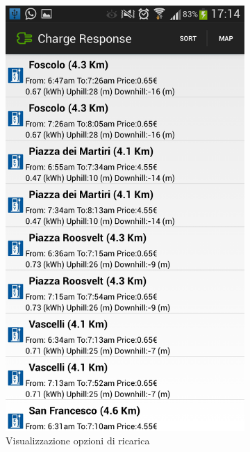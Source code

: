 \begin{figure}
\begin{subfigure}{0.45\textwidth}
		\includegraphics[width=\textwidth]{assets/mobile-app-charge-options.png}
		\caption{Visualizzazione opzioni di ricarica}
		\label{fig:charge-options}
    \end{subfigure}
	\begin{subfigure}{0.45\textwidth}

\end{subfigure}
\end{figure}
